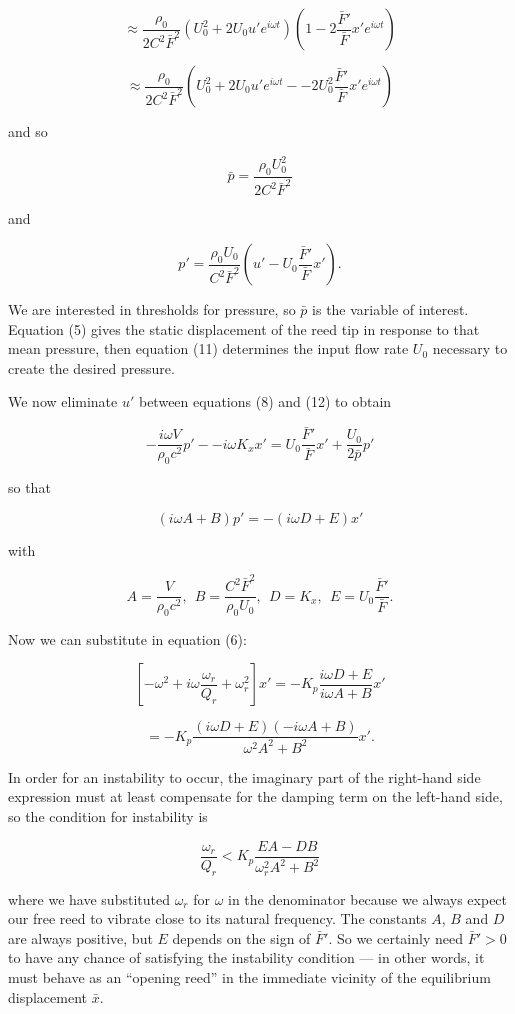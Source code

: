   $$\approx \dfrac{\rho_0}{2C^2 \bar{F}^2}\left( U_0^2 + 2 U_0 u' e^{i \omega 
  t} \right) \left(1-2\dfrac{\bar{F}'}{\bar{F}} x' e^{i \omega t} \right)$$ 

  $$\approx \dfrac{\rho_0}{2C^2 \bar{F}^2}\left( U_0^2 +2 U_0 u' e^{i \omega t} 
  -- 2U_0^2 \dfrac{\bar{F}'}{\bar{F}} x' e^{i \omega t} \right)\tag{10}$$ 

  and so 

  $$\bar{p} =\dfrac{\rho_0 U_0^2}{2C^2 \bar{F}^2}\tag{11}$$ 

  and 

  $$p'=\dfrac{\rho_0 U_0}{C^2 \bar{F}^2}\left(u'-U_0 
  \dfrac{\bar{F}'}{\bar{F}}x' \right). \tag{12}$$ 

  We are interested in thresholds for pressure, so $\bar{p}$ is the variable of 
  interest. Equation (5) gives the static displacement of the reed tip in 
  response to that mean pressure, then equation (11) determines the input flow 
  rate $U_0$ necessary to create the desired pressure. 

  We now eliminate $u'$ between equations (8) and (12) to obtain 

  $$-\dfrac{i \omega V}{\rho_0 c^2}p' -- i \omega K_x x' = U_0 
  \dfrac{\bar{F}'}{\bar{F}} x' + \dfrac{U_0}{2 \bar{p}}p' \tag{13}$$ 

  so that 

  $$(i \omega A +B)p'=-(i \omega D + E)x' \tag{14}$$ 

  with 

  $$A=\dfrac{V}{\rho_0 c^2} \mathrm{,~~} B=\dfrac{C^2 \bar{F}^2}{\rho_0 U_0} 
  \mathrm{,~~} D=K_x \mathrm{,~~} E=U_0 \dfrac{\bar{F}'}{\bar{F}} . \tag{15}$$ 

  Now we can substitute in equation (6): 

  $$\left[ -\omega^2 + i \omega \dfrac{\omega_r}{Q_r} + \omega_r^2 \right]x' = 
  -K_p \dfrac{i \omega D + E}{i \omega A + B} x'$$ 

  $$=-K_p \dfrac{(i \omega D + E)(-i \omega A + B)}{\omega^2 A^2 + B^2} x' . 
  \tag{16}$$ 

  In order for an instability to occur, the imaginary part of the right-hand 
  side expression must at least compensate for the damping term on the 
  left-hand side, so the condition for instability is 

  $$\dfrac{\omega_r}{Q_r} < K_p\dfrac{EA-DB}{\omega_r^2 A^2 + B^2} \tag{17}$$ 

  where we have substituted $\omega_r$ for $\omega$ in the denominator because 
  we always expect our free reed to vibrate close to its natural frequency. The 
  constants $A$, $B$ and $D$ are always positive, but $E$ depends on the sign 
  of $\bar{F}'$. So we certainly need $\bar{F}'>0$ to have any chance of 
  satisfying the instability condition --- in other words, it must behave as an 
  ``opening reed'' in the immediate vicinity of the equilibrium displacement 
  $\bar{x}$. 

